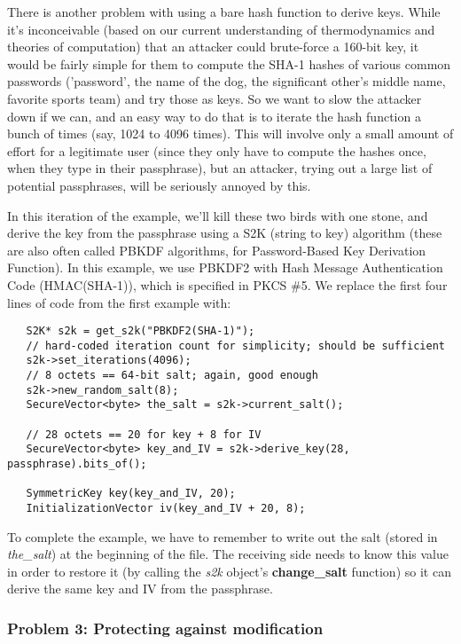 \documentclass{article}
\newcommand{\function}[1]{\textbf{#1}}
\newcommand{\variable}[1]{\textsl{#1}}
\begin{document}
There is another problem with using a bare hash function to derive
keys. While it's inconceivable (based on our current understanding of
thermodynamics and theories of computation) that an attacker could
brute-force a 160-bit key, it would be fairly simple for them to
compute the SHA-1 hashes of various common passwords ('password', the
name of the dog, the significant other's middle name, favorite sports
team) and try those as keys. So we want to slow the attacker down if
we can, and an easy way to do that is to iterate the hash function a
bunch of times (say, 1024 to 4096 times). This will involve only a
small amount of effort for a legitimate user (since they only have to
compute the hashes once, when they type in their passphrase), but an
attacker, trying out a large list of potential passphrases, will be
seriously annoyed by this.

In this iteration of the example, we'll kill these two birds with one stone,
and derive the key from the passphrase using a S2K (string to key) algorithm
(these are also often called PBKDF algorithms, for Password-Based Key
Derivation Function). In this example, we use PBKDF2 with Hash Message
Authentication Code (HMAC(SHA-1)), which is specified in PKCS \#5. We replace
the first four lines of code from the first example with:

\begin{verbatim}
   S2K* s2k = get_s2k("PBKDF2(SHA-1)");
   // hard-coded iteration count for simplicity; should be sufficient
   s2k->set_iterations(4096);
   // 8 octets == 64-bit salt; again, good enough
   s2k->new_random_salt(8);
   SecureVector<byte> the_salt = s2k->current_salt();

   // 28 octets == 20 for key + 8 for IV
   SecureVector<byte> key_and_IV = s2k->derive_key(28, passphrase).bits_of();

   SymmetricKey key(key_and_IV, 20);
   InitializationVector iv(key_and_IV + 20, 8);
\end{verbatim}

To complete the example, we have to remember to write out the salt (stored in
\variable{the\_salt}) at the beginning of the file. The receiving side needs to
know this value in order to restore it (by calling the \variable{s2k} object's
\function{change\_salt} function) so it can derive the same key and IV from the
passphrase.

\subsubsection{Problem 3: Protecting against modification}
\end{document}
